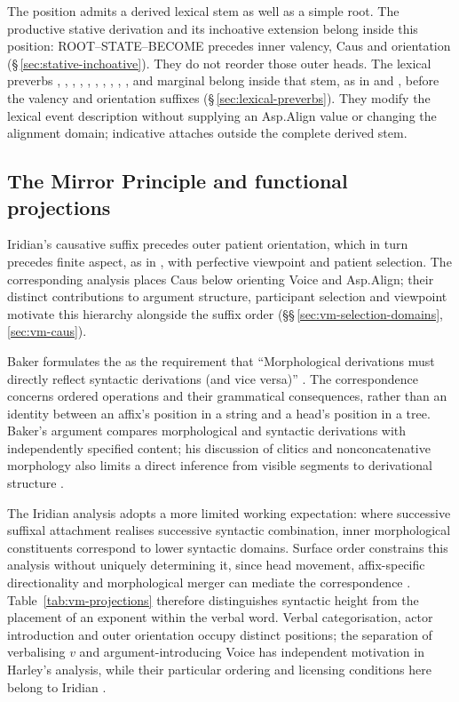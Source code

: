 The \Stem{} position admits a derived lexical stem as well as a simple root.
The productive stative derivation and its inchoative extension belong inside
this position: ROOT--STATE--BECOME precedes inner valency, Caus and orientation
(§\,\ref{sec:stative-inchoative}). They do not reorder those outer heads.
The lexical preverbs , , ,
, , , , ,
, , and marginal  belong inside that stem, as in
  and  ,
before the valency and orientation suffixes
(§\,\ref{sec:lexical-preverbs}). They modify the lexical event description
without supplying an Asp.Align value or changing the alignment domain;
indicative  attaches outside the complete derived stem.


\subsection{The Mirror Principle and functional projections}
\label{sec:vm-overview}
\label{sec:vm-mirror}

\noindent Iridian's causative suffix precedes outer patient orientation,
which in turn precedes finite aspect, as in 
, with perfective viewpoint and patient selection.
The corresponding analysis places Caus below orienting Voice and Asp.Align;
their distinct contributions to argument structure, participant selection and
viewpoint motivate this hierarchy alongside the suffix order
(§§\,\ref{sec:vm-selection-domains}, \ref{sec:vm-caus}).

Baker formulates the  as the requirement that
``Morphological derivations must directly reflect syntactic derivations
(and vice versa)'' \cite[p.~375]{baker1985}. The correspondence concerns ordered
operations and their grammatical consequences, rather than an identity between
an affix's position in a string and a head's position in a tree. Baker's
argument compares morphological and syntactic derivations with independently
specified content; his discussion of clitics and nonconcatenative morphology
also limits a direct inference from visible segments to derivational structure
\cite[§§2, 5]{baker1985}.

The Iridian analysis adopts a more limited working expectation: where
successive suffixal attachment realises successive syntactic combination,
inner morphological constituents correspond to lower syntactic domains.
Surface order constrains this analysis without uniquely determining it,
since head movement, affix-specific directionality and morphological merger
can mediate the correspondence \cite{harley2011,harley2013b}.
Table~\ref{tab:vm-projections} therefore distinguishes syntactic height from
the placement of an exponent within the verbal word. Verbal categorisation,
actor introduction and outer orientation occupy distinct positions; the
separation of verbalising $v$ and argument-introducing Voice has independent
motivation in Harley's analysis, while their particular ordering and licensing
conditions here belong to Iridian \cite{harley2013a,harley2017}.


